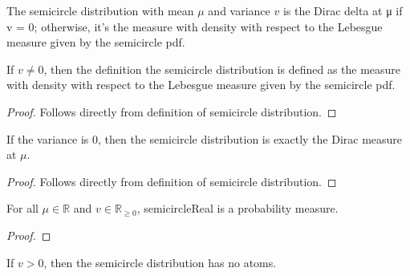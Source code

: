 

\begin{definition}
    \label{def:semicircle_distribution}
    \leanok
    The semicircle distribution with mean $\mu$ and variance $v$ is the Dirac delta at μ if v = 0; otherwise, it's the measure with density with respect to the Lebesgue measure given by the semicircle pdf.
\end{definition}

\begin{lemma}
    \label{lemma:semicircleReal_of_var_ne_zero}
    \leanok
    If $v \neq 0$, then the definition the semicircle distribution is defined as the measure with density with respect to the Lebesgue measure given by the semicircle pdf.
\end{lemma}

\begin{proof}
    Follows directly from definition of semicircle distribution.
\end{proof}

\begin{lemma}
    \label{lemma:semicircleReal_zero_var}
    \leanok
    If the variance is 0, then the semicircle distribution is exactly the Dirac measure at $\mu$.
\end{lemma}

\begin{proof}
    Follows directly from definition of semicircle distribution.
\end{proof}

\begin{lemma} %
    \label{lemma:instIsProbabilityMeasuresemicircleReal}
    \leanok

    For all $\mu \in \mathbb{R}$ and $v \in \mathbb{R}_{\ge 0}$, semicircleReal is a probability measure.
\end{lemma}

\begin{proof}
  \leanok
\end{proof}

\begin{lemma}
    \label{lemma:noAtoms_semicircleReal}
    \leanok
    If $v > 0$, then the semicircle distribution has no atoms.
\end{lemma}

